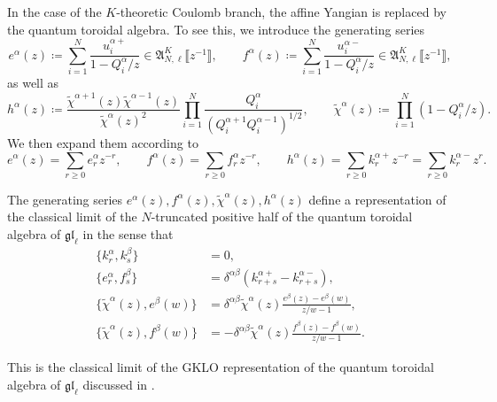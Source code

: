 In the case of the $K$-theoretic Coulomb branch, the affine Yangian is replaced by the quantum toroidal algebra. To see this, we introduce the generating series
\begin{equation}
    e^\alpha(z) \coloneq \sum_{i=1}^N \frac{u_i^{\alpha+}}{1-Q_i^\alpha/z} \in \mathfrak{A}_{N,\ell}^K\llbracket z^{-1} \rrbracket, \qquad
    f^\alpha(z) \coloneq \sum_{i=1}^N \frac{u_i^{\alpha-}}{1-Q_i^\alpha/z} \in \mathfrak{A}_{N,\ell}^K\llbracket z^{-1} \rrbracket,
\end{equation}
as well as
\begin{equation}\label{eq:modKthGaugePoly}
    h^\alpha(z) \coloneq \frac{\tilde \chi^{\alpha+1}(z) \tilde \chi^{\alpha-1}(z)}{\tilde \chi^\alpha(z)^2} \prod_{i=1}^N \frac{Q_i^\alpha}{(Q_i^{\alpha+1} Q_i^{\alpha-1})^{1/2}}, \qquad \tilde \chi^\alpha(z) \coloneq \prod_{i=1}^N (1-Q_i^\alpha/z).
\end{equation}
We then expand them according to
\begin{equation}
    e^\alpha(z) = \sum_{r \geq 0} e_r^\alpha z^{-r}, \qquad f^\alpha(z) = \sum_{r \geq 0} f_r^\alpha z^{-r}, \qquad h^\alpha(z) = \sum_{r \geq 0} k_r^{\alpha+} z^{-r} = \sum_{r \geq 0} k_r^{\alpha-} z^r.
\end{equation}

\begin{prop}
    The generating series $e^\alpha(z),f^\alpha(z),\tilde \chi^\alpha(z),h^\alpha(z)$ define a representation of the classical limit of the $N$-truncated positive half of the quantum toroidal algebra of $\mathfrak{gl}_\ell$ in the sense that
    \begin{align}
        \{ k_r^\alpha, k_s^\beta \} &= 0,
        \\[8pt]
        \{ e_r^\alpha,f_s^\beta \}
        &= \delta^{\alpha\beta} (k_{r+s}^{\alpha+} - k_{r+s}^{\alpha-}),
        \\[2pt]
        \{ \tilde \chi^\alpha(z),e^\beta(w) \}
        &= \delta^{\alpha\beta} \tilde \chi^\alpha(z) \frac{e^\beta(z)-e^\beta(w)}{z/w-1},
        \\[2pt]
        \{ \tilde \chi^\alpha(z),f^\beta(w) \}
        &= -\delta^{\alpha\beta} \tilde \chi^\alpha(z) \frac{f^\beta(z)-f^\beta(w)}{z/w-1}.
    \end{align}
\end{prop}

\begin{remark}
    This is the classical limit of the GKLO representation of the quantum toroidal algebra of $\mathfrak{gl}_\ell$ discussed in \cite{tsymbaliuk_difference_2023}.
\end{remark}

